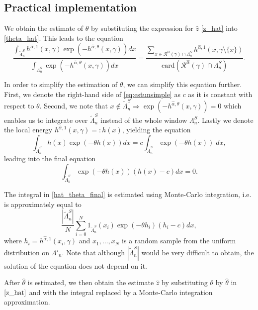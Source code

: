 \subsection{Practical implementation}
We obtain the estimate of $\theta$ by substituting the expression for $\hat z$ \eqref{z_hat} into \eqref{theta_hat}.
This leads to the equation
\begin{equation}\label{eq:estunsimple} 
\frac{\int_{\tilde\Lambda^S_n}  h^{\hat\alpha,1}(x,\gamma)\exp{\left(-h^{\hat\alpha,\theta}(x,\gamma)\right)} dx} {  \int_{\Lambda^S_n} \exp{\left( -h^{\hat\alpha,\theta}(x,\gamma)\right)} dx} 
= \frac {\sum_{x \in \mathcal R^{\hat\alpha}(\gamma)\cap \Lambda^S_n} h^{\hat\alpha,1}(x,\gamma\setminus\{x\})} { \mbox{card}(\mathcal R^{\hat\alpha}(\gamma)\cap \Lambda^S_n) }. 
\end{equation}

In order to simplify the estimation of $\theta$, we can simplify this equation further. First, we denote the right-hand side of \eqref{eq:estunsimple} as $c$ as it  is constant with respect to $\theta$. Second, we note that $x \notin \tilde\Lambda^S_n  \Rightarrow \exp{\left(-h^{\hat\alpha,\theta}(x,\gamma)\right)}= 0$ which enables us to integrate over $\tilde\Lambda^S_n$ instead of the whole window $\Lambda^S_n$. Lastly we denote the local energy $h^{\hat\alpha,1}(x,\gamma) =: h(x)$, yielding the equation 
$$ \int_{\tilde\Lambda^S_n} h(x) \exp{\left(-\theta h(x)\right)} dx = c \int_{\tilde\Lambda^S_n} \exp{\left(-\theta h(x)\right)}\;dx, $$
leading into the final equation
\begin{equation}\label{hat_theta_final} 
\int_{\tilde\Lambda^S_n} \exp{\left(-\theta h(x)\right)} (h(x) - c) dx = 0 .
\end{equation}

The integral in \eqref{hat_theta_final} is estimated using Monte-Carlo integration, i.e. is approximately equal to
$$ \frac {|\tilde\Lambda^S_n|}N \sum_{i=0}^N 1_{\tilde\Lambda^S_n}(x_i) \exp{\left( - \theta h_i \right )} (h_i- c) dx, $$
where $h_i = h^{\hat\alpha,1}(x_i, \gamma)$ and $x_1,\dots,x_N$ is a random sample from the uniform distribution on $\Lambda'_n$. Note that although $|\tilde\Lambda^S_n|$ would be very difficult to obtain, the solution of the equation does not depend on it.

After $\hat\theta$ is estimated, we then obtain the estimate $\hat z$ by substituting $\theta$ by $\hat\theta$ in $\eqref{z_hat}$ and with the integral replaced by a Monte-Carlo integration approximation.


